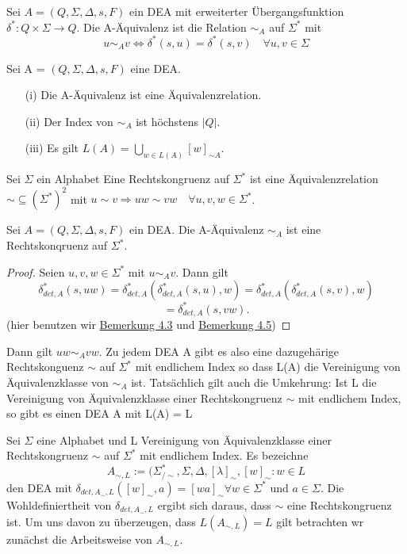   Sei \(A = (Q, \Sigma, \Delta, s, F)\) ein DEA mit erweiterter Übergangsfunktion \(\delta^{*}: Q \times \Sigma \rightarrow Q\). Die A-Äquivalenz ist die Relation \(\sim_A\) auf \(\Sigma^{*}\) mit 
\[
  u \sim_A v \Leftrightarrow \delta^*(s, u) = \delta^*(s,v) \quad \forall u, v \in \Sigma
\]

Sei A = \((Q, \Sigma, \Delta, s, F)\) eine DEA.
\begin{itemize}
  \item [(i)] Die A-Äquivalenz ist eine Äquivalenzrelation.
  \item [(ii)] Der Index von \(\sim_{A}\) ist höchstens \(|Q|\).
  \item [(iii)] Es gilt \(L(A) = \bigcup \limits_{w \in L(A)} [w]_{\sim A}\).
\end{itemize}

  Sei \(\Sigma\) ein Alphabet Eine Rechtskongruenz auf \(\Sigma^{*}\) ist eine Äquivalenzrelation \(\sim \subseteq (\Sigma^{*})^{2}\) mit \(u \sim v \Rightarrow uw \sim vw \quad \forall u, v, w \in \Sigma^{*}\).

  Sei \(A = (Q, \Sigma, \Delta, s, F)\) ein DEA. Die A-Äquivalenz \(\sim_{A}\) ist eine Rechtskonqruenz auf \(\Sigma^{*}\).
  \begin{proof}
    Seien \(u, v, w \in \Sigma^{*}\) mit \(u \sim_{A} v\). Dann gilt 
    \[
      \delta_{det, A}^{*}(s, uw) = \delta_{det,A}^{*}(\delta_{det,A}^{*}(s, u), w) = \delta_{det,A}^{*}(\delta_{det,A}^{*}(s,v), w)\] \[= \delta_{det,A}^{*}(s, vw).
    \] 
    (hier benutzen wir \hyperref[subsec:4.3]{Bemerkung 4.3} und \hyperref[subsec:4.5]{Bemerkung 4.5})    
  \end{proof} 
  Dann gilt \(uw\sim_{A}vw\). Zu jedem DEA A gibt es also eine dazugehärige Rechtskonguenz \(\sim\) auf \(\Sigma^{*}\) mit endlichem Index so dass L(A) die Vereinigung von Äquivalenzklasse von \(\sim_{A}\) ist. Tatsächlich gilt auch die Umkehrung: Ist L die Vereinigung von Äquivalenzklasse einer Rechtskongruenz \(\sim\) mit endlichem Index, so gibt es einen DEA A mit L(A) = L

  Sei \(\Sigma\) eine Alphabet und L Vereinigung von Äquivalenzklasse einer Rechtskongruenz \(\sim\) auf \(\Sigma^{*}\) mit endlichem Index. Es bezeichne
  \[
    A_{\sim , L} := (\Sigma^{*}_{/\sim}, \Sigma, \Delta, [\lambda]_{\sim}, {[w]_{\sim} : w \in L}
  \]
  den DEA mit \(\delta_{det, A_{\sim}, L}([w]_{\sim}, a) = [wa]_{\sim} \forall w \in \Sigma^{*}\) und \(a \in \Sigma\). Die Wohldefiniertheit von \(\delta_{det, A_{\sim}, L}\) ergibt sich daraus, dass \(\sim\) eine Rechtskongruenz ist. Um uns davon zu überzeugen, dass \(L(A_{\sim, L}) = L\) gilt betrachten wr zunächst die Arbeitsweise von \(A_{\sim, L}\).

